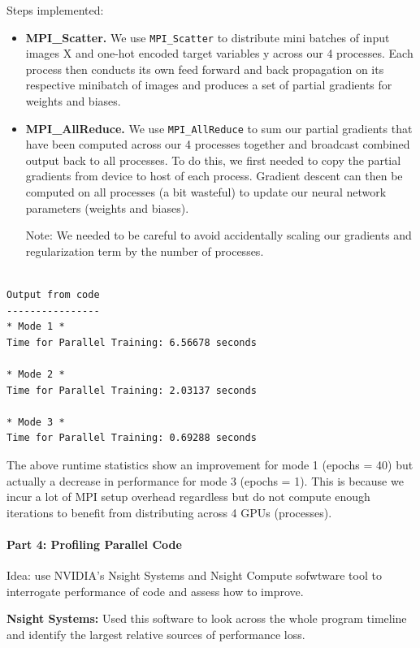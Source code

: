 \documentclass[12pt,letterpaper,twoside]{article}
\begin{document}
Steps implemented:
\begin{itemize}
    \item \textbf{MPI\_Scatter.} We use \texttt{MPI\_Scatter} to distribute mini batches
    of input images X and one-hot encoded target variables y across our 4 processes. 
    Each process then conducts its own feed forward and back propagation on its 
    respective minibatch of images and produces a set of partial gradients for 
    weights and biases.

    \item \textbf{MPI\_AllReduce.} We use \texttt{MPI\_AllReduce} to sum our partial 
    gradients that have been computed across our 4 processes together and broadcast 
    combined output back to all processes. To do this, we first needed to copy the 
    partial gradients from device to host of each process. Gradient descent can then 
    be computed on all processes (a bit wasteful) to update our neural network 
    parameters (weights and biases).

    Note: We needed to be careful to avoid accidentally scaling our gradients and 
    regularization term by the number of processes.
\end{itemize}

\begin{verbatim}

Output from code
----------------
* Mode 1 *
Time for Parallel Training: 6.56678 seconds

* Mode 2 *
Time for Parallel Training: 2.03137 seconds

* Mode 3 *
Time for Parallel Training: 0.69288 seconds
\end{verbatim}

The above runtime statistics show an improvement for mode 1 (epochs = 40) but actually
a decrease in performance for mode 3 (epochs = 1). This is because we incur a lot of
MPI setup overhead regardless but do not compute enough iterations to benefit from 
distributing across 4 GPUs (processes).


\paragraph{Part 4: Profiling Parallel Code} Idea: use NVIDIA's Nsight Systems and Nsight
Compute sofwtware tool to interrogate performance of code and assess how to improve.

\textbf{Nsight Systems:} Used this software to look across the whole program timeline 
and identify the largest relative sources of performance loss.
\end{document}
